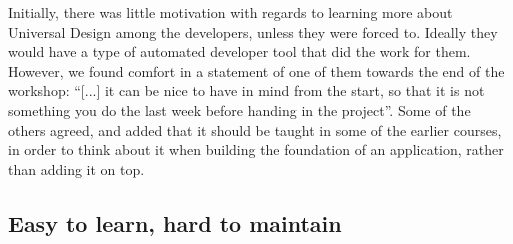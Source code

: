 Initially, there was little motivation with regards to learning more about Universal Design among the developers, unless they were forced to. Ideally they would have a type of automated developer tool that did the work for them. However, we found comfort in a statement of one of them towards the end of the workshop: “[...] it can be nice to have in mind from the start, so that it is not something you do the last week before handing in the project”. Some of the others agreed, and added that it should be taught in some of the earlier courses, in order to think about it when building the foundation of an application, rather than adding it on top. 

\fi

\subsection{Easy to learn, hard to maintain}



